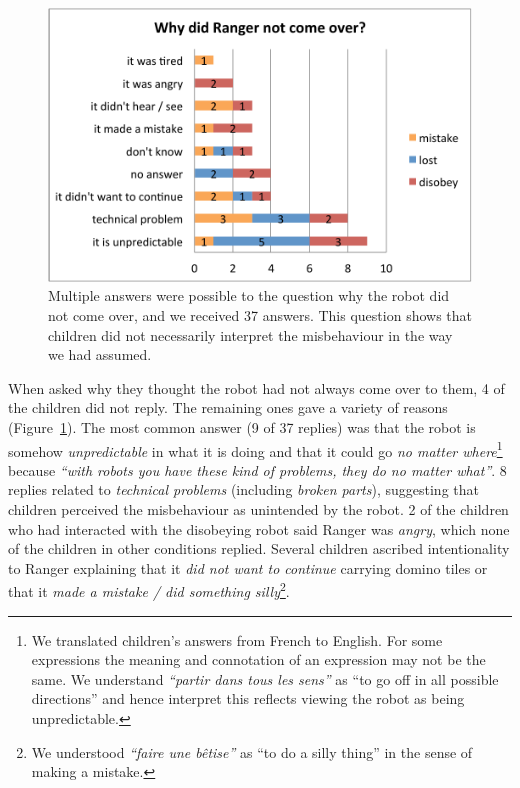 \documentclass{sig-alternate}
\begin{document}
\begin{figure}[!h]
    \centering
    \includegraphics[width=0.8\linewidth]{domino-why-misbehavior.pdf}   
    \caption[Why Did the Robot Misbehave?]{\small Multiple answers were possible
    to the question why the robot did not come over, and we received 37 answers.
    This question shows that children did not necessarily interpret the misbehaviour
    in the way we had assumed.}

    \label{fig:domino-why-misbehaviour}
\end{figure}	

When asked why they thought the robot had not always come
over to them, 4 of the children did not reply. The remaining ones gave a variety
of reasons (Figure~\ref{fig:domino-why-misbehaviour}). The most common answer (9
of 37 replies) was that the robot is somehow \textit{unpredictable} in what it
is doing and that it could go \textit{no matter where}\footnote{We translated
children's answers from French to English. For some expressions the meaning
and connotation of an expression may not be the same. We understand
\textit{``partir dans tous les sens''} as ``to go off in all possible
directions'' and hence interpret this reflects viewing the robot as being
unpredictable.} because \textit{``with robots you have these kind of problems,
they do no matter what''}. 8 replies related to \textit{technical problems}
(including \textit{broken parts}), suggesting that children perceived the
misbehaviour as unintended by the robot. 2 of the children who had interacted
with the disobeying robot said Ranger was \textit{angry}, which none of the
children in other conditions replied. Several children ascribed intentionality
to Ranger explaining that it \textit{did not want to continue} carrying domino
tiles or that it \textit{made a mistake / did something silly}\footnote{We
understood \textit{``faire une bêtise''} as ``to do a silly thing'' in the sense
of making a mistake.}.
\end{document}
